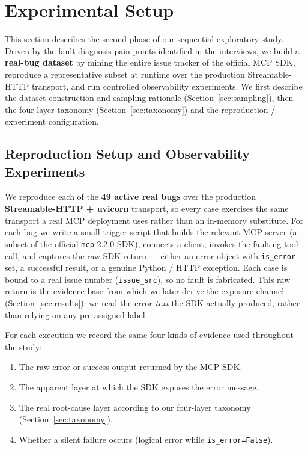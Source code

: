 \section{Experimental Setup}\label{sec:setup}

This section describes the second phase of our sequential-exploratory study. Driven by the
fault-diagnosis pain points identified in the interviews, we build a \textbf{real-bug dataset}
by mining the entire issue tracker of the official MCP SDK, reproduce a representative subset
at runtime over the production Streamable-HTTP transport, and run controlled observability
experiments. We first describe the dataset construction and sampling rationale
(Section~\ref{sec:sampling}), then the four-layer taxonomy (Section~\ref{sec:taxonomy}) and the
reproduction / experiment configuration.

\subsection{Reproduction Setup and Observability Experiments}

We reproduce each of the \textbf{49 active real bugs} over the production
\textbf{Streamable-HTTP + uvicorn} transport, so every case exercises the same transport a real
MCP deployment uses rather than an in-memory substitute. For each bug we write a small trigger
script that builds the relevant MCP server (a subset of the official \texttt{mcp} 2.2.0 SDK),
connects a client, invokes the faulting tool call, and captures the raw SDK return --- either
an error object with \texttt{is\_error} set, a successful result, or a genuine Python / HTTP
exception. Each case is bound to a real issue number (\texttt{issue\_src}), so no fault is
fabricated. This raw return is the evidence base from which we later derive the exposure channel
(Section~\ref{sec:results}): we read the error \emph{text} the SDK actually produced, rather than
relying on any pre-assigned label.

For each execution we record the same four kinds of evidence used throughout the study:
\begin{enumerate}
  \item The raw error or success output returned by the MCP SDK.
  \item The apparent layer at which the SDK exposes the error message.
  \item The real root-cause layer according to our four-layer taxonomy (Section~\ref{sec:taxonomy}).
  \item Whether a silent failure occurs (logical error while \texttt{is\_error=False}).
\end{enumerate}

